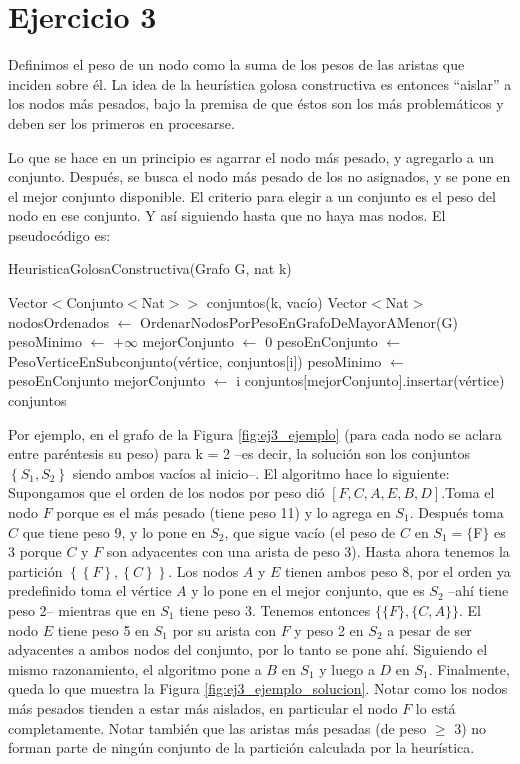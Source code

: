 \section{Ejercicio 3}

Definimos el peso de un nodo como la suma de los pesos de las aristas que inciden sobre él. La idea de la heurística golosa constructiva es entonces ``aislar'' a los nodos más pesados, bajo la premisa de que éstos son los más problemáticos y deben ser los primeros en procesarse.

Lo que se hace en un principio es agarrar el nodo más pesado, y agregarlo a un conjunto. Después, se busca el nodo más pesado de los no asignados, y se pone en el mejor conjunto disponible. El criterio para elegir a un conjunto es el peso del nodo en ese conjunto. Y así siguiendo hasta que no haya mas nodos. El pseudocódigo es:
\begin{algorithm}[H]
\begin{algorithmic}[1]
\caption{HeuristicaGolosaConstructiva(Grafo G, nat k)}
\STATE Vector$<$Conjunto$<$Nat$>>$ conjuntos(k, vacío)
\STATE Vector$<$Nat$>$ nodosOrdenados $\leftarrow$ OrdenarNodosPorPesoEnGrafoDeMayorAMenor(G)
    \STATE pesoMinimo $\leftarrow$ $+ \infty$
    \STATE mejorConjunto $\leftarrow$ 0
        \STATE pesoEnConjunto $\leftarrow$ PesoVerticeEnSubconjunto(vértice, conjuntos$[$i$]$)
            \STATE pesoMinimo $\leftarrow$ pesoEnConjunto
            \STATE mejorConjunto $\leftarrow$ i
        \ENDIF
    \ENDFOR
    \STATE conjuntos$[$mejorConjunto$]$.insertar(vértice)
\ENDFOR
\RETURN conjuntos
\end{algorithmic}
\end{algorithm}

Por ejemplo, en el grafo de la Figura \ref{fig:ej3_ejemplo} (para cada nodo se aclara entre paréntesis su peso) para k = 2 --es decir, la solución son los conjuntos $\left\{S_1, S_2\right\}$ siendo ambos vacíos al inicio--. El algoritmo hace lo siguiente: Supongamos que el orden de los nodos por peso dió $[F, C, A, E, B, D]$.Toma el nodo $F$ porque es el más pesado (tiene peso 11) y lo agrega en $S_1$. Después toma $C$ que tiene peso 9, y lo pone en $S_2$, que sigue vacío (el peso de $C$ en $S_1 = \{$F$\}$ es 3 porque $C$ y $F$ son adyacentes con una arista de peso 3). Hasta ahora tenemos la partición $\left\{ \left\{F\right\}, \left\{C\right\} \right\}$. Los nodos $A$ y $E$ tienen ambos peso 8, por el orden ya predefinido toma el vértice $A$ y lo pone en el mejor conjunto, que es $S_2$ --ahí tiene peso 2-- mientras que en $S_1$ tiene peso 3. Tenemos entonces $\{ \{F\}, \{C, A\} \}$. El nodo $E$ tiene peso 5 en $S_1$ por su arista con $F$ y peso 2 en $S_2$ a pesar de ser adyacentes a ambos nodos del conjunto, por lo tanto se pone ahí. Siguiendo el mismo razonamiento, el algoritmo pone a $B$ en $S_1$ y luego a $D$ en $S_1$. Finalmente, queda lo que muestra la Figura \ref{fig:ej3_ejemplo_solucion}. Notar como los nodos más pesados tienden a estar más aislados, en particular el nodo $F$ lo está completamente. Notar también que las aristas más pesadas (de peso $\geq$ 3) no forman parte de ningún conjunto de la partición calculada por la heurística.


